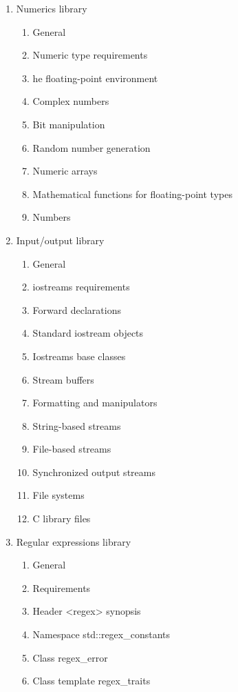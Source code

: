 \begin{enumerate}
\item Numerics library
    \begin{enumerate}[label=\arabic{enumi}.\arabic*.]
      \item  General 
      \item  Numeric type requirements 
      \item  he floating-point environment 
      \item  Complex numbers 
      \item  Bit manipulation
      \item  Random number generation 
      \item  Numeric arrays
      \item  Mathematical functions for floating-point types
      \item  Numbers
     \end{enumerate}
\item Input/output library
    \begin{enumerate}[label=\arabic{enumi}.\arabic*.]
      \item  General 
      \item iostreams requirements 
      \item  Forward declarations 
      \item  Standard iostream objects 
      \item  Iostreams base classes 
      \item  Stream buffers 
      \item  Formatting and manipulators
      \item   String-based streams 
      \item   File-based streams 
      \item   Synchronized output streams
      \item  File systems 
      \item  C library files
     \end{enumerate}
\item Regular expressions library
    \begin{enumerate}[label=\arabic{enumi}.\arabic*.]
      \item  General 
      \item  Requirements 
      \item  Header <regex> synopsis 
      \item  Namespace std::regex\_constants
      \item  Class regex\_error 
      \item  Class template regex\_traits

\end{enumerate}
\end{enumerate}
